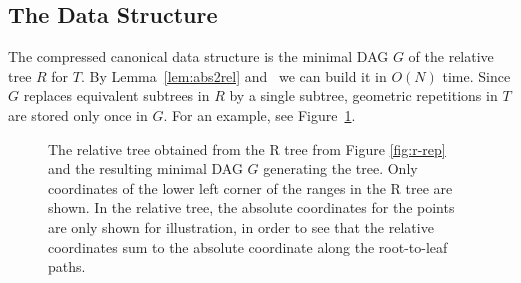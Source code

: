 \subsection{The Data Structure}
The compressed canonical data structure is the minimal DAG $G$ of the relative tree $R$ for $T$. By Lemma~\ref{lem:abs2rel} and~\cite{downey1980variations} we can build it in $O(N)$ time. Since $G$ replaces equivalent subtrees in $R$ by a single subtree, geometric repetitions in $T$ are stored only once in $G$. For an example, see Figure~\ref{fig:r-compression}. 
\begin{figure}[tb]
	\begin{center}
	\quad\quad\quad\quad{}
	\caption{The relative tree obtained from the R tree from Figure \ref{fig:r-rep} and the resulting minimal DAG $G$ generating the tree. Only coordinates of the lower left corner of the ranges in the R tree are shown. In the relative tree, the absolute coordinates for the points are only shown for illustration, in order to see that the relative coordinates sum to the absolute coordinate along the root-to-leaf paths. \label{fig:r-compression}}
	\end{center}
\end{figure}


